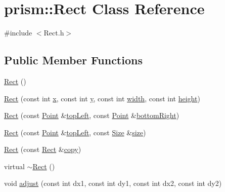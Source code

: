 \hypertarget{classprism_1_1_rect}{}\section{prism\+:\+:Rect Class Reference}
\label{classprism_1_1_rect}


{\ttfamily \#include $<$Rect.\+h$>$}

\subsection*{Public Member Functions}
\begin{DoxyCompactItemize}
\item 
\hyperlink{classprism_1_1_rect_af61646ec28b099ffe1b4901ae5639662}{Rect} ()
\item 
\hyperlink{classprism_1_1_rect_a80055d4dfd1f9feb803a4419cd43671d}{Rect} (const int \hyperlink{classprism_1_1_rect_a202fa9a56964c9111a968fb9b420f5f4}{x}, const int \hyperlink{classprism_1_1_rect_a6e951744e0bba0fed781b86ab0be680b}{y}, const int \hyperlink{classprism_1_1_rect_a8dae47a50fdac7a5f7e8aabef68437aa}{width}, const int \hyperlink{classprism_1_1_rect_ad713f4536accdc6d5d2e6a6d83eac78b}{height})
\item 
\hyperlink{classprism_1_1_rect_a62e6eaa2eba9506e830bd6f3ff817bca}{Rect} (const \hyperlink{classprism_1_1_point}{Point} \&\hyperlink{classprism_1_1_rect_a2900a6e837124886d2e6aa500fba5bde}{top\+Left}, const \hyperlink{classprism_1_1_point}{Point} \&\hyperlink{classprism_1_1_rect_a97eb5a66441a49c7e149229376aba6a0}{bottom\+Right})
\item 
\hyperlink{classprism_1_1_rect_afda4a2a6cc3bdfd2e4e213813f6d0653}{Rect} (const \hyperlink{classprism_1_1_point}{Point} \&\hyperlink{classprism_1_1_rect_a2900a6e837124886d2e6aa500fba5bde}{top\+Left}, const \hyperlink{classprism_1_1_size}{Size} \&\hyperlink{classprism_1_1_rect_adcbe6d279ad57294c88d287057867a2b}{size})
\item 
\hyperlink{classprism_1_1_rect_a03f9f2832b8f325ded900d85b2d12ea3}{Rect} (const \hyperlink{classprism_1_1_rect}{Rect} \&\hyperlink{namespaceprism_ae776f4cd825f79e7af1cf6ee1d90a209}{copy})
\item 
virtual \hyperlink{classprism_1_1_rect_acf86bebcd76de609a3619b063de6a7fe}{$\sim$\+Rect} ()
\item 
void \hyperlink{classprism_1_1_rect_a8bbcfbe99d39f7350dc7801ed5cf6d48}{adjust} (const int dx1, const int dy1, const int dx2, const int dy2)
\item 

\end{DoxyCompactItemize}
